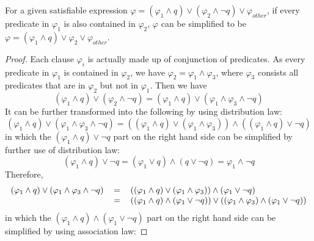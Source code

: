 \begin{theorem}
For a given satisfiable expression $\varphi = (\varphi _{1} \wedge q) \vee (\varphi _{2} \wedge \neg q) \vee \varphi _{other}$, if every predicate in $\varphi _{1}$ is also contained in $\varphi _{2}$,
$\varphi$ can be simplified to be $\varphi = (\varphi _{1} \wedge q) \vee \varphi _{2} \vee \varphi _{other}$.
\end{theorem}
\begin{proof}
Each clause $\varphi _{i}$ is actually made up of conjunction of predicates. As every predicate in $\varphi _{1}$ is contained in $\varphi _{2}$, we have $\varphi _{2} = \varphi _{1} \wedge \varphi _{3}$,
where $\varphi _{3}$ consists all predicates that are in $\varphi _{2}$ but not in $\varphi _{1}$. Then we have
\begin{equation}
(\varphi _{1} \wedge q) \vee (\varphi _{2} \wedge \neg q) = (\varphi _{1} \wedge q) \vee (\varphi _{1} \wedge \varphi _{3} \wedge \neg q)
\end{equation}
It can be further transformed into the following by using distribution law:
\begin{equation}
(\varphi _{1} \wedge q) \vee (\varphi _{1} \wedge \varphi _{3} \wedge \neg q) = ((\varphi _{1} \wedge q) \vee (\varphi _{1} \wedge \varphi _{3})) \wedge ((\varphi _{1} \wedge q) \vee \neg q)
\end{equation}
in which the $(\varphi _{1} \wedge q) \vee \neg q$ part on the right hand side can be simplified by further use of distribution law:
\begin{equation}
(\varphi _{1} \wedge q) \vee \neg q = (\varphi _{1} \vee q) \wedge (q \vee \neg q) = \varphi _{1} \wedge \neg q
\end{equation}
Therefore,
\begin{equation}
\begin{tabular}{rcl}
$(\varphi _{1} \wedge q) \vee (\varphi _{1} \wedge \varphi _{3} \wedge \neg q)$&$=$&$((\varphi _{1} \wedge q) \vee (\varphi _{1} \wedge \varphi _{3})) \wedge (\varphi _{1} \vee \neg q)$ \\
                                                                               &$=$&$((\varphi _{1} \wedge q) \wedge (\varphi _{1} \vee \neg q)) \vee ((\varphi _{1} \wedge \varphi _{3}) \wedge (\varphi _{1} \vee \neg q))$ \\
\end{tabular}
\end{equation}
in which the $(\varphi _{1} \wedge q) \wedge (\varphi _{1} \vee \neg q)$ part on the right hand side can be simplified by using association law:

\end{proof}
